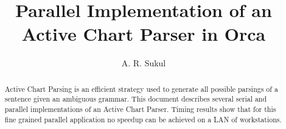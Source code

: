 




\newcommand{\fsection}[1]{\section { #1}}
\newcommand{\ftitle}[1]{\title { #1}}
\newcommand{\fsubsection}[1]{\subsection { #1}}
\newcommand{\fsubsubsection}[1]{\subsubsection { #1}}








\title{Parallel Implementation of an Active Chart Parser in Orca}
\author{A. R. Sukul}



\maketitle

\begin{abstract}
Active Chart Parsing is an efficient strategy used to
generate all possible parsings of a sentence given an ambiguous
grammar. This document describes several serial and parallel
implementations of an Active Chart
Parser. Timing results show that for this fine grained parallel application no
speedup can be achieved on a LAN of workstations. 
\end{abstract}


